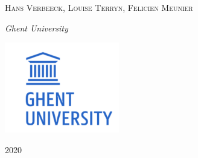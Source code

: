 \begin{titlepage}
	{\scshape Hans Verbeeck, Louise Terryn, Felicien Meunier \\} %
	
	\vspace{0.5\baselineskip} %
	
	\textit{Ghent University \\} %
	
	\vfill %
	
	
	
	\includegraphics[width = 50mm]{figures/UGhent2.png}
	
	\vspace{0.3\baselineskip} %
	
	2020 %
	

\end{titlepage}


